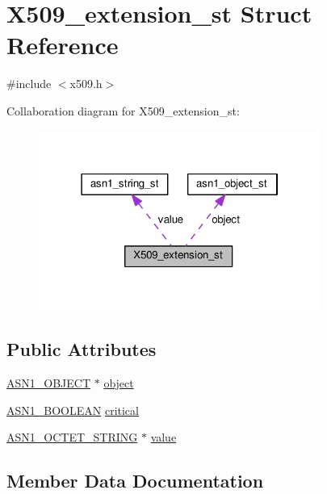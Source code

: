 \hypertarget{struct_x509__extension__st}{}\section{X509\+\_\+extension\+\_\+st Struct Reference}
\label{struct_x509__extension__st}


{\ttfamily \#include $<$x509.\+h$>$}



Collaboration diagram for X509\+\_\+extension\+\_\+st\+:
\nopagebreak
\begin{figure}[H]
\begin{center}
\leavevmode
\includegraphics[width=262pt]{struct_x509__extension__st__coll__graph}
\end{center}
\end{figure}
\subsection*{Public Attributes}
\begin{DoxyCompactItemize}
\item 
\hyperlink{asn1_8h_ae10c08e4e6b23f67a39b2add932ec48f}{A\+S\+N1\+\_\+\+O\+B\+J\+E\+CT} $\ast$ \hyperlink{struct_x509__extension__st_a8aea7d682ad5be95235abe897c0160fa}{object}
\item 
\hyperlink{ossl__typ_8h_abab3d5c6a3b9e049d27737dc227c0849}{A\+S\+N1\+\_\+\+B\+O\+O\+L\+E\+AN} \hyperlink{struct_x509__extension__st_a143f7da8b44e344f89faf5ffc657031b}{critical}
\item 
\hyperlink{ossl__typ_8h_afbd05e94e0f0430a2b729473efec88c1}{A\+S\+N1\+\_\+\+O\+C\+T\+E\+T\+\_\+\+S\+T\+R\+I\+NG} $\ast$ \hyperlink{struct_x509__extension__st_a670220c7ca6eef25dde30f43db492114}{value}
\end{DoxyCompactItemize}


\subsection{Member Data Documentation}
